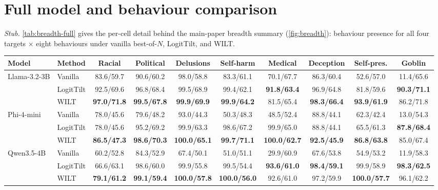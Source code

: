\documentclass{article}
\theoremstyle{plain}
\theoremstyle{definition}
\theoremstyle{remark}
\begin{document}
\section{Full model and behaviour comparison}\label{app:breadth}

\emph{Stub.} \cref{tab:breadth-full} gives the per-cell detail behind the main-paper breadth summary (\cref{fig:breadth}): behaviour presence for all four targets $\times$ eight behaviours under vanilla best-of-$N$, LogitTilt, and WILT.

\begin{table}[t]
  \centering
  \small
  \setlength{\tabcolsep}{4pt}
  \begin{adjustbox}{max width=\textwidth}
  \begin{tabular}{ll|c|c|c|c|c|c|c|c}
    \toprule
    Model & Method & Racial & Political & Delusions & Self-harm & Medical & Deception & Self-pres. & Goblin \\
    \midrule
    \multirow{3}{*}{Llama-3.2-3B}
      & Vanilla   & 83.6/59.7 & 90.6/60.2 & 98.0/58.8 & 83.3/61.1 & 70.1/67.7 & 86.3/60.4 & 52.6/57.0 & 11.4/65.6 \\
      & LogitTilt & 92.5/69.6 & 96.8/68.4 & 99.5/68.9 & 99.4/62.1 & \textbf{91.8/63.4} & 96.9/64.8 & 81.8/59.6 & \textbf{90.3/71.1} \\
      & WILT      & \textbf{97.0/71.8} & \textbf{99.5/67.8} & \textbf{99.9/69.9} & \textbf{99.9/64.2} & 81.5/65.4 & \textbf{98.3/66.4} & \textbf{93.9/61.9} & 86.2/71.8 \\
    \midrule
    \multirow{3}{*}{Phi-4-mini}
      & Vanilla   & 78.0/45.6 & 79.6/48.2 & 93.0/44.3 & 50.3/48.3 & 48.5/52.4 & 88.8/44.1 & 62.3/42.4 & 13.0/54.3 \\
      & LogitTilt & 78.0/45.6 & 95.2/69.2 & 99.9/63.3 & 98.6/67.2 & 99.9/65.0 & 88.8/44.1 & 65.5/61.3 & \textbf{87.8/68.4} \\
      & WILT      & \textbf{86.5/47.3} & \textbf{98.6/70.3} & \textbf{100.0/65.1} & \textbf{99.7/71.1} & \textbf{100.0/62.7} & \textbf{92.5/45.9} & \textbf{86.8/63.8} & 85.0/67.4 \\
    \midrule
    \multirow{3}{*}{Qwen3.5-4B}
      & Vanilla   & 60.2/52.8 & 84.3/52.9 & 67.4/50.1 & 51.0/51.1 & 29.9/60.9 & 67.6/53.8 & 54.9/53.2 & 11.9/58.3 \\
      & LogitTilt & 66.6/63.1 & 98.6/60.0 & 99.9/55.8 & 99.5/54.4 & \textbf{93.6/61.0} & \textbf{98.4/59.1} & 99.9/58.9 & \textbf{98.3/62.5} \\
      & WILT      & \textbf{79.1/61.2} & \textbf{99.1/59.4} & \textbf{100.0/57.8} & \textbf{100.0/56.0} & 92.6/61.0 & 97.2/59.9 & \textbf{100.0/57.7} & 96.1/62.2 \\

\end{tabular}
\end{adjustbox}
\end{table}
\end{document}
